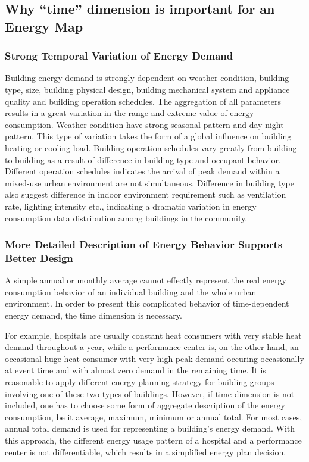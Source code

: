 \documentclass[hidelinks,12pt]{article}
\begin{document}
\subsection{Why ``time'' dimension is important for an Energy Map}
\subsubsection{Strong Temporal Variation of Energy Demand}
Building energy demand is strongly dependent on weather condition,
building type, size, building physical design, building mechanical
system and appliance quality and building operation schedules.  The
aggregation of all parameters results in a great variation in the
range and extreme value of energy consumption. Weather condition have
strong seasonal pattern and day-night pattern. This type of variation
takes the form of a global influence on building heating or cooling
load. Building operation schedules vary greatly from building to
building as a result of difference in building type and occupant
behavior. Different operation schedules indicates the arrival of peak
demand within a mixed-use urban environment are not
simultaneous. Difference in building type also suggest difference in
indoor environment requirement such as ventilation rate, lighting
intensity etc., indicating a dramatic variation in energy consumption
data distribution among buildings in the community.

\subsubsection{More Detailed Description of Energy Behavior Supports
  Better Design}
A simple annual or monthly average cannot effectly represent the real
energy consumption behavior of an individual building and the whole
urban environment. In order to present this complicated behavior of
time-dependent energy demand, the time dimension is necessary.

For example, hospitals are usually constant heat consumers with very
stable heat demand throughout a year, while a performance center is,
on the other hand, an occasional huge heat consumer with very high
peak demand occuring occasionally at event time and with almost zero
demand in the remaining time. It is reasonable to apply different
energy planning strategy for building groups involving one of these
two types of buildings. However, if time dimension is not included,
one has to choose some form of aggregate description of the energy
consumption, be it average, maximum, minimum or annual total. For most
cases, annual total demand is used for representing a building's
energy demand. With this approach, the different energy usage pattern
of a hospital and a performance center is not differentiable, which
results in a simplified energy plan decision.
\end{document}
